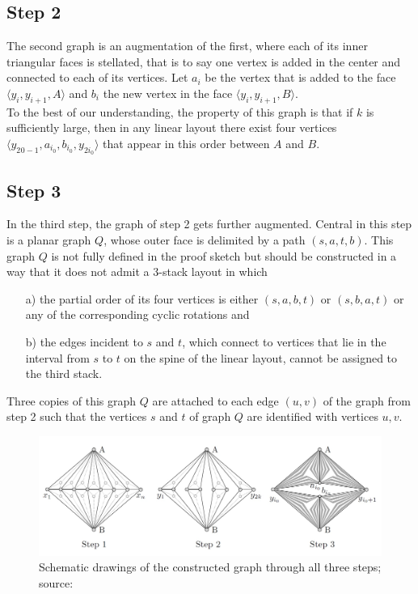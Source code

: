 \subsection{Step 2}
\label{S2}
The second graph is an augmentation of the first, where each of its inner triangular faces is stellated, that is to say one vertex is added in the center and connected to each of its vertices. Let $a_i$ be the vertex that is added to the face $\langle y_i, y_{i+1}, A\rangle$ and $b_i$ the new vertex in the face $\langle y_i, y_{i+1}, B \rangle$.\\
To the best of our understanding, the property of this graph is that if $k$ is sufficiently large, then in any linear layout there exist four vertices $\langle y_{2_{}0-1}, a_{i_0}, b_{i_0}, y_{2i_0} \rangle$ that appear in this order between $A$ and $B$. 

\subsection{Step 3}
\label{S3}
In the third step, the graph of step 2 gets further augmented. Central in this step is a planar graph $Q$, whose outer face is delimited by a path $(s,a,t,b)$. This graph $Q$ is not fully defined in the proof sketch but should be constructed in a way that it does not admit a 3-stack layout in which 
\begin{enumerate}
\item[a)] the partial order of its four vertices is either $(s,a,b,t)$ or $(s,b,a,t)$ or any of the corresponding cyclic rotations and
\item[b)] the edges incident to $s$ and $t$, which connect to vertices that lie in the interval from $s$ to $t$ on the spine of the linear layout, cannot be assigned to the third stack.
\end{enumerate}
Three copies of this graph $Q$ are attached to each edge $(u,v)$ of the graph from step 2 such that the vertices $s$ and $t$ of graph $Q$ are identified with vertices $u,v$.
\begin{figure}[h!]
\begin{center}
\includegraphics[width=1\textwidth]{figures/yannakakis.jpg}
\caption{Schematic drawings of the constructed graph through all three steps; source: \cite{bekos2019}}
\label{YannakakisGraphs}
\end{center}
\end{figure}
